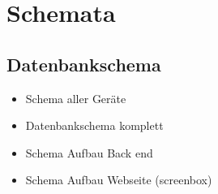 \section{Schemata}

\subsection{Datenbankschema}
\label{anhang:Datenbankschema}




\begin{itemize}
	\item Schema aller Geräte
	\item Datenbankschema komplett
	\item Schema Aufbau Back end
	\item Schema Aufbau Webseite (screenbox)
\end{itemize}
